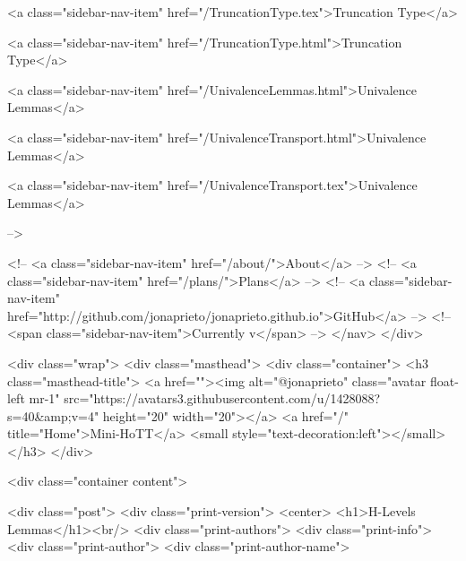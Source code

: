      
    
      
        
          <a class="sidebar-nav-item" href="/TruncationType.tex">Truncation Type</a>
        
      
    
      
        
          <a class="sidebar-nav-item" href="/TruncationType.html">Truncation Type</a>
        
      
    
      
        
          <a class="sidebar-nav-item" href="/UnivalenceLemmas.html">Univalence Lemmas</a>
        
      
    
      
        
          <a class="sidebar-nav-item" href="/UnivalenceTransport.html">Univalence Lemmas</a>
        
      
    
      
        
          <a class="sidebar-nav-item" href="/UnivalenceTransport.tex">Univalence Lemmas</a>
        
      
     -->

    <!-- <a class="sidebar-nav-item" href="/about/">About</a> -->
    <!-- <a class="sidebar-nav-item" href="/plans/">Plans</a> -->
    <!-- <a class="sidebar-nav-item" href="http://github.com/jonaprieto/jonaprieto.github.io">GitHub</a> -->
    <!-- <span class="sidebar-nav-item">Currently v</span> -->
  </nav>
</div>

    <div class="wrap">
      <div class="masthead">
        <div class="container">
          <h3 class="masthead-title">
            <a href=""><img alt="@jonaprieto" class="avatar float-left mr-1" src="https://avatars3.githubusercontent.com/u/1428088?s=40&amp;v=4" height="20" width="20"></a>
            <a href="/" title="Home">Mini-HoTT</a>
            <small style="text-decoration:left"></small>
          </h3>
        </div>
      
      <div class="container content">
        







<div class="post">
  <div class="print-version">
    <center>
      <h1>H-Levels Lemmas</h1><br/>
        <div class="print-authors">
          <div class="print-info">
            <div class="print-author">
              <div class="print-author-name">
                
